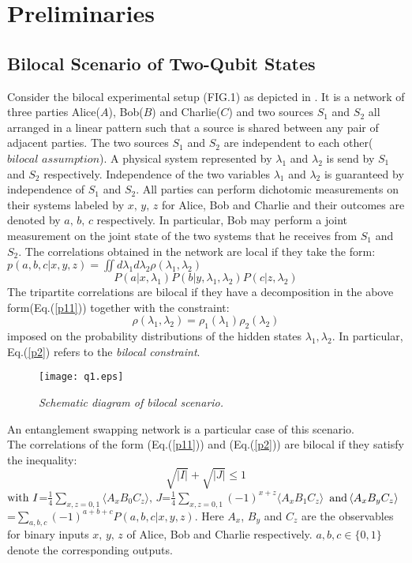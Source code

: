 \documentclass[pra,10pt,twocolumn,superscriptaddress,floatfix,showpacs]{revtex4-1}
\begin{document}
\section{Preliminaries}\label{pre}
\subsection{Bilocal Scenario of Two-Qubit States}
Consider the bilocal experimental setup (FIG.1) as depicted in \cite{BRA,BRAN}. It is a network of three parties Alice($A$), Bob($B$) and Charlie($C$) and two sources $S_1$ and $S_2$ all arranged in a linear pattern such that a source is shared between any pair of adjacent parties. The two sources $S_1$ and $S_2$ are independent to each other($\textit{bilocal assumption}$). A physical system represented by $\lambda_1$ and $\lambda_2$ is send by $S_1$ and $S_2$ respectively. Independence of the two variables $\lambda_1$ and $\lambda_2$ is guaranteed by independence of $S_1$ and $S_2$. All parties can perform dichotomic measurements on their systems labeled by $x,\,y,\,z$ for Alice, Bob and Charlie and their outcomes are denoted by $a,\,b,\,c$ respectively. In particular, Bob may perform a joint measurement on the joint state of the two systems that he receives from $S_1$ and $S_2$. The correlations obtained in the network are local if they take the form:
$p(a, b, c|x, y, z)=\iint d\lambda_{1} d\lambda_{2} {\rho(\lambda_1,\lambda_2)}$
\begin{equation}\label{p11}
P(a|x, \lambda_1)P(b|y, \lambda_1, \lambda_2)P(c|z, \lambda_2)
\end{equation}
The tripartite correlations are bilocal if they have a decomposition in the above form(Eq.(\ref{p11})) together with the constraint:
\begin{equation}\label{p2}
    \rho(\lambda_1,\lambda_2)=\rho_1(\lambda_1)\rho_2(\lambda_2)
\end{equation}
 imposed on the probability distributions of the hidden states $\lambda_1, \lambda_2$. In particular, Eq.(\ref{p2}) refers to the \textit{bilocal constraint}.
\begin{figure}[htb]
\texttt{[image: q1.eps]}\\
\caption{\emph{Schematic diagram of bilocal scenario\cite{BRA,BRAN}. }}
\end{figure}
An entanglement swapping network is a particular case of this scenario\cite{BRA,BRAN,Ross,Fritz,Ros}.\\
 The correlations of the form (Eq.(\ref{p11})) and (Eq.(\ref{p2})) are bilocal if they satisfy the inequality\cite{BRAN}:
\begin{equation}\label{A3}
 \sqrt{|I|} + \sqrt{|J|}\leq1
\end{equation}
$\textmd{with}\,\,I$=$\frac{1}{4}\sum \limits_{x, z=0,1}\langle A_x B_0 C_z\rangle,\,J$=$\frac{1}{4}\sum \limits_{x, z=0, 1}(-1)^{x+z}\langle A_x B_1 C_z\rangle\,$ $\textmd{and}\,\langle A_x B_y C_z\rangle$=$\sum\limits_{a, b, c}(-1)^{a+b+c}P(a, b, c|x,y, z).$ Here $A_x$, $B_y$ and $C_z$ are the observables for binary inputs $x,\,y,\,z$ of Alice, Bob and Charlie respectively. $a,b,c\in\{0,1\}$ denote the corresponding outputs.
\end{document}
